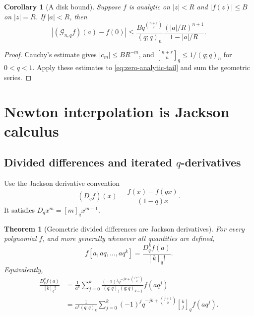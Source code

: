 \documentclass[11pt,a4paper,oneside]{article}
\newtheorem{theorem}{Theorem}[section]
\newtheorem{corollary}[corollary]{Corollary}
\theoremstyle{definition}
\theoremstyle{remark}
\newcommand{\Gop}{\mathcal G}
\newcommand{\abs}[1]{\left\lvert#1\right\rvert}
\newcommand{\qbinom}[3]{\genfrac{[}{]}{0pt}{}{#1}{#2}_{#3}}
\begin{document}
\begin{corollary}[A disk bound]
\label{cor:disk-bound}
Suppose $f$ is analytic on $|z|<R$ and $|f(z)|\le B$ on $|z|=R$.  If
$|a|<R$, then
\begin{equation}
 \abs{(\Gop_{n,q}f)(a)-f(0)}
 \le
 \frac{Bq^{\binom{n+1}{2}}}{(q;q)_n}
 \frac{(|a|/R)^{n+1}}{1-|a|/R}.
 \label{eq:disk-filter-bound}
\end{equation}
\end{corollary}

\begin{proof}
Cauchy's estimate gives $|c_m|\le BR^{-m}$, and
$\qbinom{n+r}{n}q\le1/(q;q)_n$ for $0<q<1$.  Apply these estimates to
\eqref{eq:zero-analytic-tail} and sum the geometric series.
\end{proof}

\section{Newton interpolation is Jackson calculus}
\label{sec:jackson}

\subsection{Divided differences and iterated \texorpdfstring{$q$}{q}-derivatives}

Use the Jackson derivative convention
\begin{equation}
 (D_qf)(x)=\frac{f(x)-f(qx)}{(1-q)x}.
 \label{eq:jackson-definition}
\end{equation}
It satisfies $D_qx^m=[m]_qx^{m-1}$.

\begin{theorem}[Geometric divided differences are Jackson derivatives]
\label{thm:jackson-divided}
For every polynomial $f$, and more generally whenever all quantities are
defined,
\begin{equation}
 f[a,aq,\ldots,aq^k]
 =\frac{D_q^kf(a)}{[k]_q!}.
 \label{eq:jackson-divided}
\end{equation}
Equivalently,
\begin{align}
 \frac{D_q^kf(a)}{[k]_q!}
 &=\frac1{a^k}
 \sum_{j=0}^k
 \frac{(-1)^jq^{-jk+\binom{j+1}{2}}}
 {(q;q)_j(q;q)_{k-j}}f(aq^j)
 \label{eq:jackson-explicit}\\
 &=\frac1{a^k(q;q)_k}
 \sum_{j=0}^k(-1)^jq^{-jk+\binom{j+1}{2}}
 \qbinom kjq f(aq^j).
 \label{eq:jackson-explicit-qbinom}
\end{align}
\end{theorem}
\end{document}
